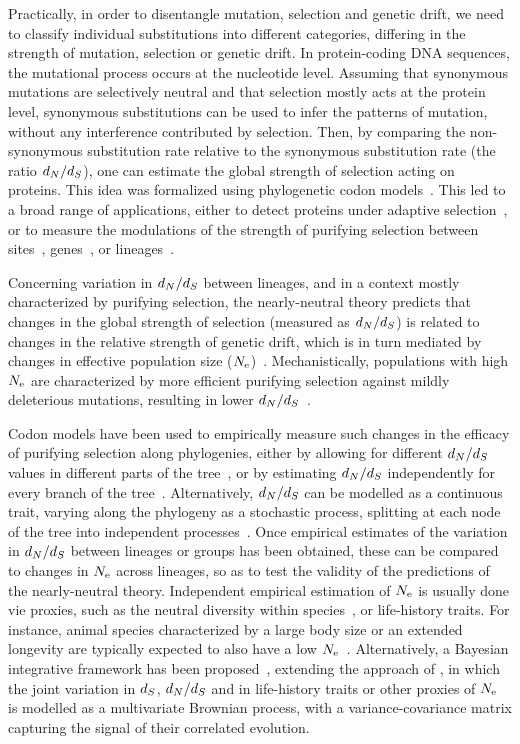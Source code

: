 \documentclass{MBE}
\begin{document}
	Practically, in order to disentangle mutation, selection and {genetic drift}, we need to classify individual substitutions into different categories, differing in the strength of mutation, selection or {genetic drift}.
	In protein-coding {DNA} sequences, the mutational process occurs at the nucleotide level.
	Assuming that {synonymous} mutations are selectively {neutral} and that selection mostly acts at the protein level, {synonymous} substitutions can be used to infer the patterns of mutation, without any interference contributed by selection.
	Then, by comparing the {non-synonymous} {substitution} rate relative to the {synonymous} {substitution} rate (the ratio $d_N / d_S$), one can estimate the global strength of selection acting on proteins.
	This idea was formalized using phylogenetic {codon} models~\citep{Muse1994,Goldman1994}.
	This led to a broad range of applications, either to detect proteins under adaptive selection~\citep{Kosiol2008}, or to measure the modulations of the strength of purifying selection between sites~\citep{Echave2016}, genes~\citep{Zhang2015}, or lineages~\citep{Lartillot2011}.

	Concerning variation in $d_N / d_S$ between lineages, and in a context mostly characterized by purifying selection, the {nearly-neutral} theory predicts that changes in the global strength of selection (measured as $d_N / d_S$) is related to changes in the relative strength of {genetic drift}, which is in turn mediated by changes in {effective population size} ($N_{\text{e}}$)~\citep{Ohta1992}.
	Mechanistically, populations with high $N_{\text{e}}$ are characterized by more efficient purifying selection against mildly deleterious mutations, resulting in lower $d_N / d_S$~\citep{Kimura1979, Welch2008}.

	Codon models have been used to empirically measure such changes in the efficacy of purifying selection along phylogenies, either by allowing for different $d_N / d_S$ values in different parts of the tree~\citep{Dutheil2012}, or by estimating $d_N / d_S$ independently for every branch of the tree~\citep{Popadin2007}.
	Alternatively, $d_N / d_S$ can be modelled as a continuous trait, varying along the phylogeny as a stochastic process, splitting at each node of the tree into independent processes~\citep{Seo2004}.
	Once empirical estimates of the variation in $d_N / d_S$ between lineages or groups has been obtained, these can be compared to changes in $N_{\text{e}}$ across lineages, so as to test the validity of the predictions of the {nearly-neutral} theory.
	Independent empirical estimation of $N_{\text{e}}$ is usually done vie proxies, such as the {neutral} diversity within species~\citep{Galtier2016}, or life-history traits.
	For instance, animal species characterized by a large body size or an extended longevity are typically expected to also have a low $N_{\text{e}}$~\citep{Romiguier2014}.
	Alternatively, a Bayesian integrative framework has been proposed~\citep{Lartillot2011}, extending the approach of \citet{Seo2004}, in which the joint variation in $d_S$, $d_N / d_S$ and in life-history traits or other proxies of $N_{\text{e}}$ is modelled as a multivariate Brownian process, with a variance-covariance matrix capturing the signal of their correlated evolution.
\end{document}
